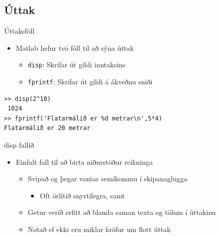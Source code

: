 \documentclass[handout]{beamer}
\begin{document}
\subsection{Úttak}

\begin{frame}[fragile]{Úttaksföll}
\begin{itemize}
 \item Matlab hefur tvö föll til að sýna úttak
 \begin{itemize}
  \item \texttt{disp}: Skrifar út gildi inntaksins
  \item \texttt{fprintf}: Skrifar út gildi á ákveðnu sniði
 \end{itemize}
\end{itemize}
\begin{verbatim}
>> disp(2^10)
 1024
>> fprintf('Flatarmálið er %d metrar\n',5*4)
Flatarmálið er 20 metrar
\end{verbatim}
\end{frame}

\begin{frame}{disp fallið}
\begin{itemize}
 \item Einfalt fall til að birta niðurstöður reikninga
 \begin{itemize}
  \item Svipað og þegar vantar semíkommu í skipanaglugga
  \begin{itemize}
   \item Oft örlítið snyrtilegra, samt
  \end{itemize}
  \item Getur verið erfitt að blanda saman texta og tölum í úttakinu
  \item Notað ef ekki eru miklar kröfur um flott úttak
 \end{itemize}
\end{itemize}
\end{frame}
\end{document}
